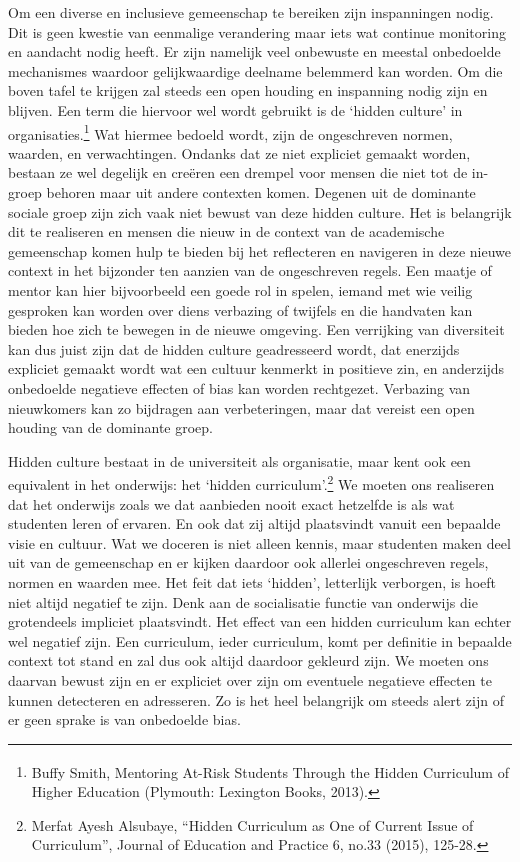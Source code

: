 \documentclass{jote-book}
\begin{document}
	Om een diverse en inclusieve gemeenschap te bereiken zijn inspanningen nodig. Dit is geen kwestie van eenmalige verandering maar iets wat continue monitoring en aandacht nodig heeft. Er zijn namelijk veel onbewuste en meestal onbedoelde mechanismes waardoor gelijkwaardige deelname belemmerd kan worden. Om die boven tafel te krijgen zal steeds een open houding en inspanning nodig zijn en blijven. Een term die hiervoor wel wordt gebruikt is de ‘hidden culture' in organisaties.\footnote{\textsuperscript{ }Buffy Smith, Mentoring At-Risk Students Through the Hidden Curriculum of Higher Education (Plymouth: Lexington Books, 2013).} Wat hiermee bedoeld wordt, zijn de ongeschreven normen, waarden, en verwachtingen. Ondanks dat ze niet expliciet gemaakt worden, bestaan ze wel degelijk en creëren een drempel voor mensen die niet tot de in-groep behoren maar uit andere contexten komen. Degenen uit de dominante sociale groep zijn zich vaak niet bewust van deze hidden culture. Het is belangrijk dit te realiseren en mensen die nieuw in de context van de academische gemeenschap komen hulp te bieden bij het reflecteren en navigeren in deze nieuwe context in het bijzonder ten aanzien van de ongeschreven regels. Een maatje of mentor kan hier bijvoorbeeld een goede rol in spelen, iemand met wie veilig gesproken kan worden over diens verbazing of twijfels en die handvaten kan bieden hoe zich te bewegen in de nieuwe omgeving. Een verrijking van diversiteit kan dus juist zijn dat de hidden culture geadresseerd wordt, dat enerzijds expliciet gemaakt wordt wat een cultuur kenmerkt in positieve zin, en anderzijds onbedoelde negatieve effecten of bias kan worden rechtgezet. Verbazing van nieuwkomers kan zo bijdragen aan verbeteringen, maar dat vereist een open houding van de dominante groep.



	Hidden culture bestaat in de universiteit als organisatie, maar kent ook een equivalent in het onderwijs: het ‘hidden curriculum'.\footnote{Merfat Ayesh Alsubaye, “Hidden Curriculum as One of Current Issue of Curriculum”, Journal of Education and Practice 6, no.33 (2015), 125-28.} We moeten ons realiseren dat het onderwijs zoals we dat aanbieden nooit exact hetzelfde is als wat studenten leren of ervaren. En ook dat zij altijd plaatsvindt vanuit een bepaalde visie en cultuur. Wat we doceren is niet alleen kennis, maar studenten maken deel uit van de gemeenschap en er kijken daardoor ook allerlei ongeschreven regels, normen en waarden mee. Het feit dat iets ‘hidden', letterlijk verborgen, is hoeft niet altijd negatief te zijn. Denk aan de socialisatie functie van onderwijs die grotendeels impliciet plaatsvindt. Het effect van een hidden curriculum kan echter wel negatief zijn. Een curriculum, ieder curriculum, komt per definitie in bepaalde context tot stand en zal dus ook altijd daardoor gekleurd zijn. We moeten ons daarvan bewust zijn en er expliciet over zijn om eventuele negatieve effecten te kunnen detecteren en adresseren. Zo is het heel belangrijk om steeds alert zijn of er geen sprake is van onbedoelde bias.
\end{document}
